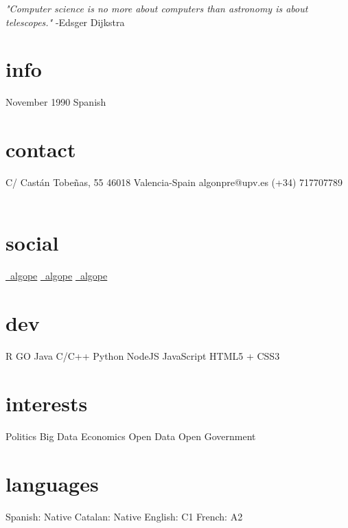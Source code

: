 \documentclass[]{cv}
\begin{document}
       {\emph{"Computer science is no more about computers than astronomy is about telescopes."} -Edsger Dijkstra}


\begin{aside}
	\section{info}
	November 1990
	Spanish
	~~~
    \section{contact}
        C/ Castán Tobeñas, 55
        46018 Valencia-Spain
        algonpre@upv.es
        (+34) 717707789
        ~~~
    \section{social}
        \href{https://www.linkedin.com/in/algope}{\faLinkedin\ algope} 
        \href{http://github.com/algope}{\faGithub\ algope}
        \href{http://twitter.com/algope_}{\faTwitter\ algope}
        ~~~
    \section{dev}
        R
        GO
        Java
        C/C++
        Python
        NodeJS
        JavaScript
        HTML5 + CSS3
        ~~~
    \section{interests}
        Politics
        Big Data
        Economics
        Open Data
        Open Government
        ~~~
     \section{languages}
     	Spanish: Native
     	Catalan: Native
     	English: C1
     	French: A2
     	~~~
\end{aside}
\end{document}
